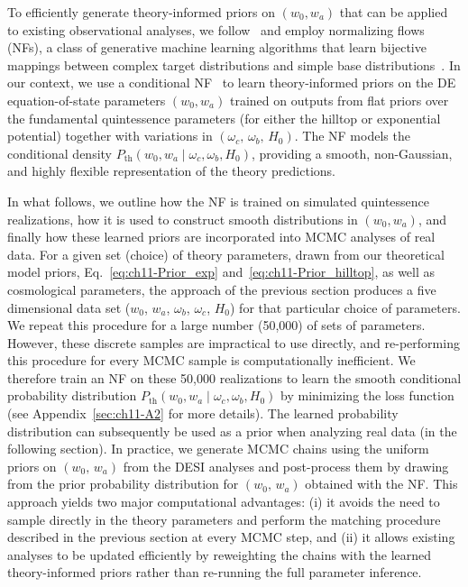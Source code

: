 \noindent
To efficiently generate theory-informed priors on $(w_0, w_a)$ that can be applied to existing observational analyses, we follow~\cite{Toomey:2024ita} and employ normalizing flows (NFs), a class of generative machine learning algorithms that learn bijective mappings between complex target distributions and simple base distributions~\cite{nfs}. In our context, we use a conditional NF~\cite{2015arXiv150505770J, 2017arXiv170507057P}
 to learn theory-informed priors on the DE equation-of-state parameters $(w_0, w_a)$   trained on outputs from flat priors over the fundamental quintessence parameters (for either the hilltop or exponential potential) together with variations in $(\omega_c,\,\omega_b, \,H_0)$. The NF models the conditional density $P_{\mathrm{th}}(w_0, w_a \mid \omega_c, \omega_b, H_0)$, providing a smooth, non-Gaussian, and highly flexible representation of the theory predictions.

 In what follows, we outline how the NF is trained on simulated quintessence realizations, how it is used to construct smooth distributions in $(w_0, w_a)$, and finally how these learned priors are incorporated into MCMC analyses of real data. For a given set (choice) of theory parameters, drawn from our
theoretical model priors, Eq.~\eqref{eq:ch11-Prior_exp} and~\eqref{eq:ch11-Prior_hilltop}, as well as cosmological parameters, the approach of the previous section produces a five dimensional data set ($w_0$, $w_a$, $\omega_b$, $\omega_c$, $H_0$) for that particular choice of parameters. We repeat this procedure for a large number (50,000) of sets of parameters. However, these discrete samples are impractical to use directly, and re-performing this procedure for every MCMC sample is computationally inefficient. We therefore train an NF on these 50,000 realizations to learn the smooth conditional probability distribution $P_{\mathrm{th}}(w_0, w_a \mid \omega_c, \omega_b, H_0)$ by minimizing the loss function (see Appendix~\ref{sec:ch11-A2} for more details). The learned  probability distribution can subsequently be used as a prior when analyzing real data (in the following section). In practice, we generate MCMC chains using the uniform priors on $(w_0,\, w_a)$ from the DESI analyses and post-process them by drawing from the prior probability distribution for $(w_0,\,w_a)$ obtained with the NF. This approach yields two major computational advantages: (i) it avoids the need to sample directly in the theory parameters and perform the matching procedure described in the previous section at every MCMC step, and (ii) it allows existing analyses to be updated efficiently by reweighting the chains with the learned theory-informed priors rather than re-running the full parameter inference.


